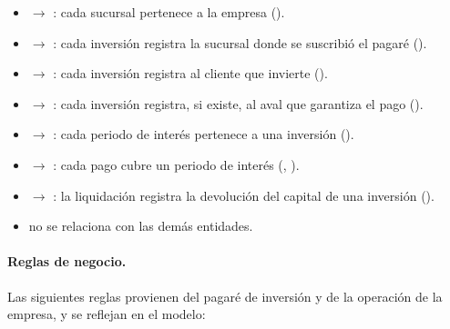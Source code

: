 \begin{itemize}[leftmargin=*]
	\item {} $\rightarrow$ : cada sucursal pertenece a la empresa ().
	\item {} $\rightarrow$ : cada inversi\'on registra la sucursal donde se suscribi\'o el pagar\'e ().
	\item {} $\rightarrow$ : cada inversi\'on registra al cliente que invierte ().
	\item {} $\rightarrow$ : cada inversi\'on registra, si existe, al aval que garantiza el pago ().
	\item {} $\rightarrow$ : cada periodo de inter\'es pertenece a una inversi\'on ().
	\item {} $\rightarrow$ : cada pago cubre un periodo de inter\'es (, ).
	\item {} $\rightarrow$ : la liquidaci\'on registra la devoluci\'on del capital de una inversi\'on ().
	\item {} no se relaciona con las dem\'as entidades.
\end{itemize}

\paragraph{Reglas de negocio.} Las siguientes reglas provienen del pagaré de inversión y de la operación de la empresa, y se reflejan en el modelo:

